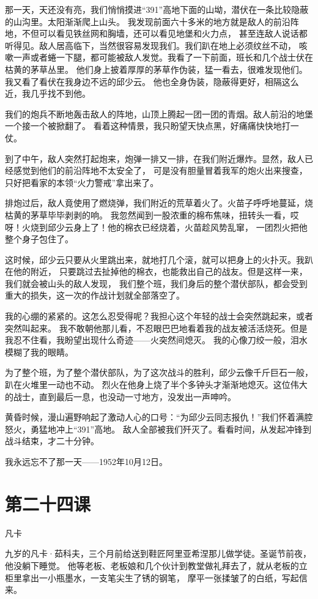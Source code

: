 \documentclass[12pt,UTF8]{ctexbook}
\begin{document}
那一天，天还没有亮，我们悄悄摸进“391”高地下面的山坳，潜伏在一条比较隐蔽的山沟里。太阳渐渐爬上山头。
我发现前面六十多米的地方就是敌人的前沿阵地，不但可以看见铁丝网和胸墙，还可以看见地堡和火力点，
甚至连敌人说话都听得见。敌人居高临下，当然很容易发现我们。我们趴在地上必须纹丝不动，
咳嗽一声或者蜷一下腿，都可能被敌人发觉。我看了一下前面，班长和几个战士伏在枯黄的茅草丛里。
他们身上披着厚厚的茅草作伪装，猛一看去，很难发现他们。我又看了看伏在我身边不远的邱少云。
他也全身伪装，隐蔽得更好，相隔这么近，我几乎找不到他。

我们的炮兵不断地轰击敌人的阵地，山顶上腾起一团一团的青烟。敌人前沿的地堡一个接一个被掀翻了。
看着这种情景，我只盼望天快点黑，好痛痛快快地打一仗。

到了中午，敌人突然打起炮来，炮弹一排又一排，在我们附近爆炸。显然，敌人已经感觉到他们的前沿阵地不太安全了，
可是没有胆量冒着我军的炮火出来搜查，只好把看家的本领“火力警戒”拿出来了。

排炮过后，敌人竟使用了燃烧弹，我们附近的荒草着火了。火苗子呼呼地蔓延，烧枯黄的茅草毕毕剥剥的响。
我忽然闻到一股浓重的棉布焦味，扭转头一看，哎呀！火烧到邱少云身上了！他的棉衣已经烧着，火苗趁风势乱窜，
一团烈火把他整个身子包住了。

这时候，邱少云只要从火里跳出来，就地打几个滚，就可以把身上的火扑灭。我趴在他的附近，
只要跳过去扯掉他的棉衣，也能救出自己的战友。但是这样一来，我们就会被山头的敌人发现，
我们整个班，我们身后的整个潜伏部队，都会受到重大的损失，这一次的作战计划就全部落空了。

我的心绷的紧紧的。这怎么忍受得呢？我担心这个年轻的战士会突然跳起来，或者突然叫起来。
我不敢朝他那儿看，不忍眼巴巴地看着我的战友被活活烧死。但是我忍不住看，我盼望出现什么奇迹——火突然间熄灭。
我的心像刀绞一般，泪水模糊了我的眼睛。

为了整个班，为了整个潜伏部队，为了这次战斗的胜利，邱少云像千斤巨石一般，趴在火堆里一动也不动。
烈火在他身上烧了半个多钟头才渐渐地熄灭。这位伟大的战士，直到最后一息，也没动一寸地方，没发出一声呻吟。

黄昏时候，漫山遍野响起了激动人心的口号：“为邱少云同志报仇！”我们怀着满腔怒火，勇猛地冲上“391”高地。
敌人全部被我们歼灭了。看看时间，从发起冲锋到战斗结束，才二十分钟。

我永远忘不了那一天——1952年10月12日。

\section{第二十四课}

凡卡


九岁的凡卡·茹科夫，三个月前给送到鞋匠阿里亚希涅那儿做学徒。圣诞节前夜，他没躺下睡觉。
他等老板、老板娘和几个伙计到教堂做礼拜去了，就从老板的立柜里拿出一小瓶墨水，一支笔尖生了锈的钢笔，
摩平一张揉皱了的白纸，写起信来。
\end{document}
